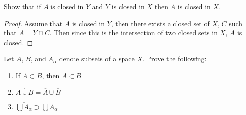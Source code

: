  



    \maketitle

    \question 
    Show that if $A$ is closed in $Y$ and $Y$ is closed in $X$ then $A$ is closed in $X$. 

    \begin{proof}
        Assume that $A$ is closed in $Y$, then there exists a closed set of $X$, $C$ such that $A = Y \cap C$. 
        Then since this is the intersection of two closed sets in $X$, $A$ is closed. 
    \end{proof}

    \question 
    Let $A$, $B$, and $A_\alpha$ denote subsets of a space $X$. Prove the following: 
    \begin{enumerate}
        \item If $A \subset B$, then $\bar{A} \subset \bar{B}$ 
        \item $\overline{A \cup B} = \overline{A} \cup \overline{B}$ 
        \item $\overline{\bigcup A_\alpha } \supset \bigcup \overline{A_\alpha}$
        
    \end{enumerate}

